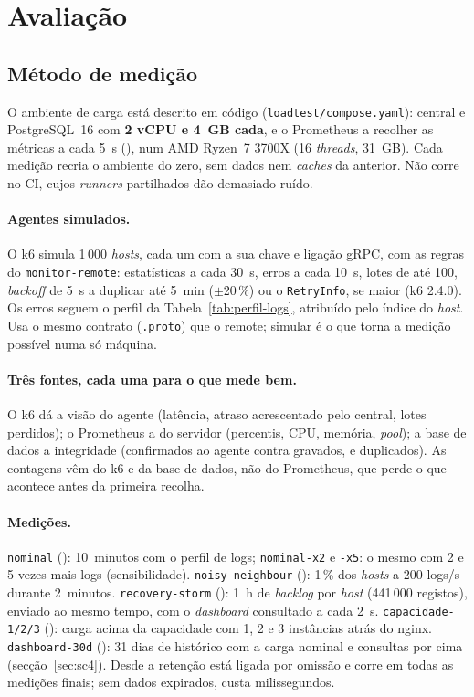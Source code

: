 \section{Avaliação}
\label{sec:avaliacao}

\subsection{Método de medição}
\label{sec:metodo}

O ambiente de carga está descrito em código (\texttt{loadtest/compose.yaml}): central e PostgreSQL~16 com
\textbf{2 vCPU e 4~GB cada}, e o Prometheus a recolher as métricas a cada 5~s (), num AMD Ryzen~7 3700X
(16 \emph{threads}, 31~GB). Cada medição recria o ambiente do zero, sem dados nem \emph{caches} da anterior. Não
corre no CI, cujos \emph{runners} partilhados dão demasiado ruído.

\paragraph{Agentes simulados.}
O k6 simula 1\,000 \emph{hosts}, cada um com a sua chave e ligação gRPC, com as regras do \texttt{monitor-remote}:
estatísticas a cada 30~s, erros a cada 10~s, lotes de até 100, \emph{backoff} de 5~s a duplicar até 5~min
($\pm$20\,\%) ou o \texttt{RetryInfo}, se maior (k6 2.4.0). Os erros
seguem o perfil da Tabela~\ref{tab:perfil-logs}, atribuído pelo índice do \emph{host}. Usa o mesmo contrato
(\texttt{.proto}) que o remote; simular é o que torna a medição possível numa só máquina.

\paragraph{Três fontes, cada uma para o que mede bem.}
O k6 dá a visão do agente (latência, atraso acrescentado pelo central, lotes perdidos); o Prometheus a do servidor
(percentis, CPU, memória, \emph{pool}); a base de dados a integridade (confirmados ao agente contra gravados, e
duplicados). As contagens vêm do k6 e da base de dados, não do Prometheus, que perde o que acontece antes da
primeira recolha.

\paragraph{Medições.}
\texttt{nominal} (): 10~minutos com o perfil de logs; \texttt{nominal-x2} e \texttt{-x5}: o mesmo com
2 e 5 vezes mais logs (sensibilidade). \texttt{noisy-neighbour} (): 1\,\% dos \emph{hosts} a 200 logs/s
durante 2~minutos. \texttt{recovery-storm} (): 1~h de \emph{backlog} por \emph{host} (441\,000 registos),
enviado ao mesmo tempo, com o \emph{dashboard} consultado a cada 2~s. \texttt{capacidade-1/2/3} (): carga
acima da capacidade com 1, 2 e 3 instâncias atrás do nginx. \texttt{dashboard-30d} (): 31 dias de
histórico com a carga nominal e consultas por cima (secção~\ref{sec:sc4}). Desde  a retenção está ligada por
omissão e corre em todas as medições finais; sem dados expirados, custa milissegundos.

